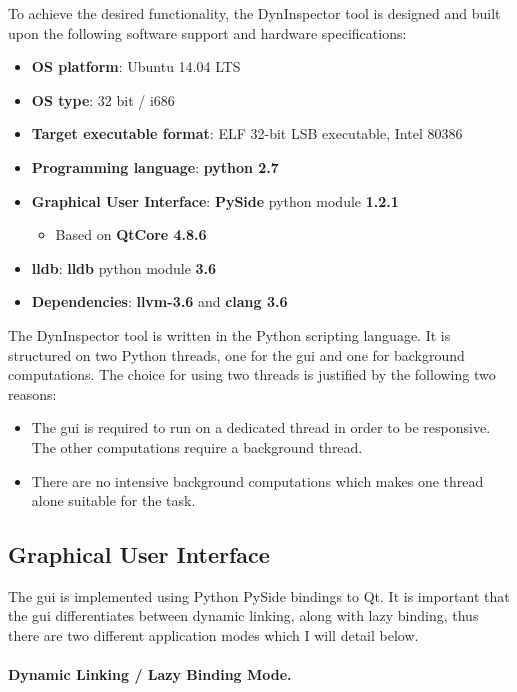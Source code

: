 To achieve the desired functionality, the DynInspector tool is designed and built upon the following software support and hardware specifications:

\begin{itemize}
\item \textbf{OS platform}: Ubuntu 14.04  LTS
\item \textbf{OS type}: 32 bit / i686
\item \textbf{Target executable format}: ELF 32-bit LSB  executable, Intel 80386
\item \textbf{Programming language}: \textbf{python 2.7}
\item \textbf{Graphical User Interface}: \textbf{PySide} python module \textbf{1.2.1}
\begin{itemize}
\item Based on \textbf{QtCore 4.8.6}
\end{itemize}
\item \textbf{lldb}: \textbf{lldb} python module \textbf{3.6}
\item \textbf{Dependencies}: \textbf{llvm-3.6} and \textbf{clang 3.6}
\end{itemize}

The DynInspector tool is written in the Python scripting language. It is structured on two Python threads, one for the gui and one for background computations. The choice for using two threads is justified by the following two reasons:
\begin{itemize}
\item The gui is required to run on a dedicated thread in order to be responsive. The other computations require a background thread.
\item There are no intensive background computations which makes one thread alone suitable for the task.
\end{itemize}

\subsection{Graphical User Interface}

The gui is implemented using Python PySide bindings to Qt. It is important that the gui differentiates between dynamic linking, along with lazy binding, thus there are two different application modes which I will detail below.

\paragraph{Dynamic Linking / Lazy Binding Mode.}

